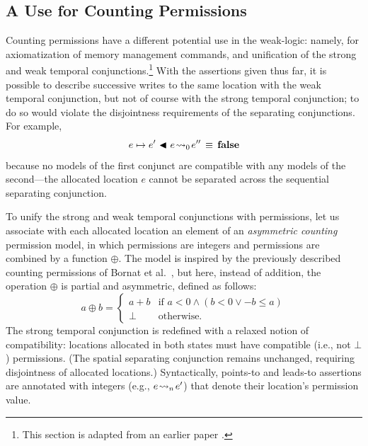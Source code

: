 \documentclass[11pt]{report}         %
\begin{document}
\subsection{A Use for Counting Permissions}


Counting permissions have a different potential use in the weak-logic: namely, for axiomatization of memory management commands, and unification of the strong and weak temporal conjunctions.\footnote{This section is adapted from an earlier paper \cite{lola11}.} With the assertions given thus far, it is possible to describe successive writes to the same location with the weak temporal conjunction, but not of course with the strong temporal conjunction; to do so would violate the disjointness requirements of the separating conjunctions. For example, \[ e \mapsto e' \operatorname{\,\blacktriangleleft\,} e \!\leadsto_{0}\! e'' \,\equiv\, \mathbf{false}\] because no models of the first conjunct are compatible with any models of the second---the allocated location $e$ cannot be separated across the sequential separating conjunction.

To unify the strong and weak temporal conjunctions with permissions, let us associate with each allocated location an element of an \emph{asymmetric counting} permission model, in which permissions are integers and permissions are combined by a function $\oplus$. The model is inspired by the previously described counting permissions of Bornat et al.~\cite{DBLP:conf/popl/BornatCOP05}, but here, instead of addition, the operation $\oplus$ is partial and asymmetric, defined as follows: \[ a\oplus b = \begin{cases} a + b & \text{if $a < 0 \wedge (b < 0 \vee -b \leq a)$} \\ \bot & \text{otherwise.}\end{cases} \] The strong temporal conjunction is redefined with a relaxed notion of compatibility: locations allocated in both states must have compatible (i.e., not $\bot$) permissions. (The spatial separating conjunction remains unchanged, requiring disjointness of allocated locations.) Syntactically, points-to and leads-to assertions are annotated with integers (e.g., $e \!\leadsto_{n}\! e'$) that denote their location's permission value.
\end{document}
